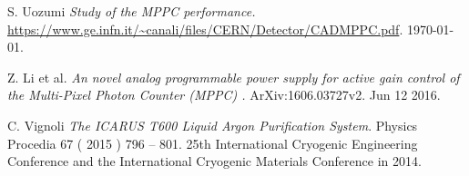 \documentclass[a4paper]{article}\linespread{1.4}
\begin{document}
\begin{thebibliography}{9}





S. Uozumi
\textit{Study of the MPPC performance.}
\url{https://www.ge.infn.it/~canali/files/CERN/Detector/CADMPPC.pdf}.
\today.

Z. Li et al.
\textit{An novel analog programmable power supply for active gain control of the Multi-Pixel Photon Counter (MPPC) .}
ArXiv:1606.03727v2.
Jun 12 2016.

C. Vignoli
\textit{The ICARUS T600 Liquid Argon Purification System}.
Physics Procedia 67 ( 2015 ) 796 – 801.
25th International Cryogenic Engineering Conference and the International Cryogenic Materials Conference in 2014.











\end{thebibliography}
\end{document}
